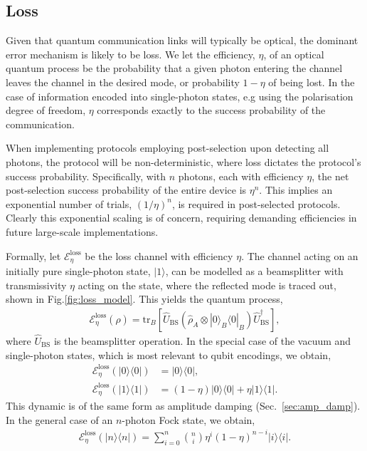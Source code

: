 \documentclass[aps, rmp, twocolumn, amsmath, amssymb, nofootinbib, superscriptaddress, longbibliography, floatfix, table-of-contents, eqsecnum]{revtex4-1}
\newcommand{\bra}[1]{\langle#1|}
\newcommand{\ket}[1]{|#1\rangle}
\begin{document}
%
%

\subsection{Loss} \label{sec:eff_err} 

Given that quantum communication links will typically be optical, the dominant error mechanism is likely to be loss. We let the efficiency, $\eta$, of an optical quantum process be the probability that a given photon entering the channel leaves the channel in the desired mode, or probability \mbox{$1-\eta$} of being lost. In the case of information encoded into single-photon states, e.g using the polarisation degree of freedom, $\eta$ corresponds exactly to the success probability of the communication.

When implementing protocols employing post-selection upon detecting all photons, the protocol will be non-deterministic, where loss dictates the protocol's success probability. Specifically, with $n$ photons, each with efficiency $\eta$, the net post-selection success probability of the entire device is $\eta^n$. This implies an exponential number of trials, \mbox{$(1/\eta)^n$}, is required in post-selected protocols. Clearly this exponential scaling is of concern, requiring demanding efficiencies in future large-scale implementations.

Formally, let $\mathcal{E}^\text{loss}_\eta$ be the loss channel with efficiency $\eta$. The channel acting on an initially pure single-photon state, $\ket{1}$, can be modelled as a beamsplitter with transmissivity $\eta$ acting on the state, where the reflected mode is traced out, shown in Fig.\ref{fig:loss_model}. This yields the quantum process,
\begin{align}
\mathcal{E}^\text{loss}_\eta(\hat\rho) = \text{tr}_B[\hat{U}_\text{BS}(\hat\rho_A\otimes\ket{0}_B\bra{0}_B)\hat{U}_\text{BS}^\dag],
\end{align}
where $\hat{U}_\text{BS}$ is the beamsplitter operation. In the special case of the vacuum and single-photon states, which is most relevant to qubit encodings, we obtain,
\begin{align}
	\mathcal{E}^\text{loss}_\eta(\ket{0}\bra{0}) &= \ket{0}\bra{0}, \nonumber \\
\mathcal{E}^\text{loss}_\eta(\ket{1}\bra{1}) &= (1-\eta)\ket{0}\bra{0} + \eta\ket{1}\bra{1}.
\end{align}
This dynamic is of the same form as amplitude damping (Sec.~\ref{sec:amp_damp}). In the general case of an $n$-photon Fock state, we obtain,
\begin{align}
	\mathcal{E}^\text{loss}_\eta(\ket{n}\bra{n}) = \sum_{i=0}^n \binom{n}{i} \eta^i(1-\eta)^{n-i} \ket{i}\bra{i}.
\end{align}
\end{document}
